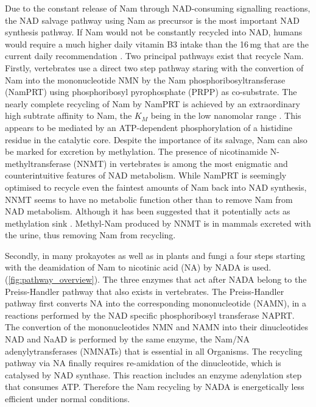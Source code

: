 Due to the constant release of Nam through NAD-consuming signalling reactions, the NAD salvage pathway using Nam as precursor is the most important NAD synthesis pathway. If Nam would not be constantly recycled into NAD, humans would require a much higher daily vitamin B3 intake than the 16\,mg that are the current daily recommendation \cite{CommissionofEuropeanCommunities2008}. Two principal pathways exist that recycle Nam. Firstly, vertebrates use a direct two step pathway staring with the convertion of Nam into the mononucleotide NMN by the Nam phosphoribosyltransferase (NamPRT) using phosphoribosyl pyrophosphate (PRPP) as co-substrate. The nearly complete recycling of Nam by NamPRT is achieved by an extraordinary high subtrate affinity to Nam, the $K_{M}$ being in the low nanomolar range \cite{Burgos2008}. This appears to be mediated by an ATP-dependent phosphorylation of a histidine residue in the catalytic core. Despite the importance of its salvage, Nam can also be marked for excretion by methylation. The presence of nicotinamide N-methyltransferase (NNMT) in vertebrates \cite{Gossmann2012FEBS} is among the most enigmatic and counterintuitive features of NAD metabolism. While NamPRT is seemingly optimised to recycle even the faintest amounts of Nam back into NAD synthesis, NNMT seems to have no metabolic function other than to remove Nam from NAD metabolism. Although it has been suggested that it potentially acts as methylation sink \cite{NNMTreview2018} . Methyl-Nam produced by NNMT is in mammals excreted with the urine, thus removing Nam from recycling. 

Secondly, in many prokayotes as well as in plants and fungi a four steps starting with the deamidation of Nam to nicotinic acid (NA) by NADA is used. (\ref{fig:pathway_overview}). The three enzymes that act after NADA belong to the Preiss-Handler pathway that also exists in vertebrates. The Preiss-Handler pathway first converts  NA into the corresponding mononucleotide (NAMN), in a reactions performed by the NAD specific phosphoribosyl transferase NAPRT. The convertion of the mononucleotides  NMN and NAMN into their dinucleotides NAD and NaAD is performed by the same enzyme, the  Nam/NA adenylytransferases (NMNATs) that is essential in all Organisms\cite{Gossmann2011}. The recycling pathway via NA finally requires re-amidation of the dinucleotide, which is catalysed by NAD synthase. This reaction includes an enzyme adenylation step that consumes ATP. Therefore the Nam recycling by NADA is energetically less efficient under normal conditions.


